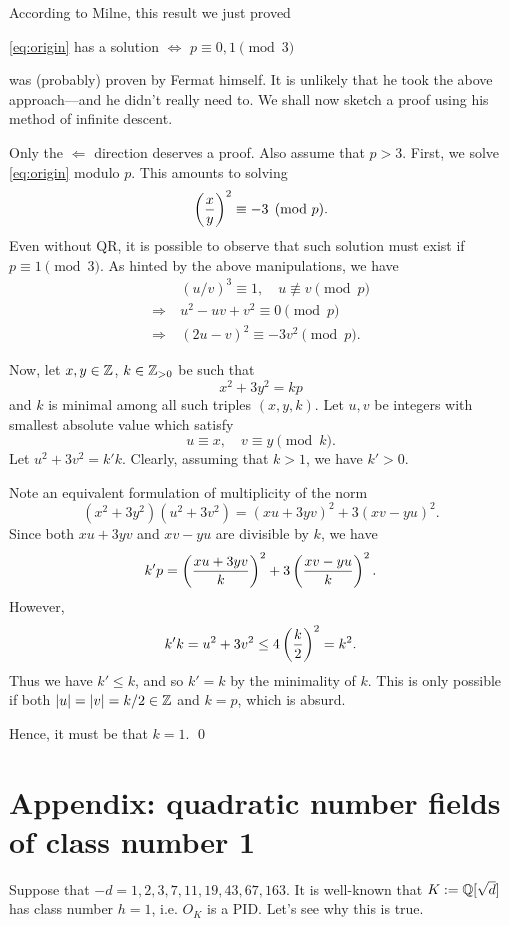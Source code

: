 \documentclass{article}
\begin{document}
According to Milne, this result we just proved
\begin{center}
    \eqref{eq:origin} has a solution $\Longleftrightarrow$ $p\equiv 0,1\pmod{3}$
\end{center}
was (probably) proven by Fermat himself. It is unlikely that he took the above approach---and he didn't really need to. We shall now sketch a proof using his method of infinite descent.

Only the $\Longleftarrow$ direction deserves a proof. Also assume that $p>3$. First, we solve \eqref{eq:origin} modulo $p$. This amounts to solving
\[
    \left(\frac{x}{y}\right)^2 \equiv -3 \pmod{p}.
\]
Even without QR, it is possible to observe that such solution must exist if $p\equiv 1\pmod{3}$. As hinted by the above manipulations, we have
\begin{align*}
    & (u/v)^3 \equiv 1, \quad u\not\equiv v \pmod{p} \\
    \Longrightarrow\ & u^2 - uv + v^2 \equiv 0 \pmod{p} \\
    \Longrightarrow\ & (2u-v)^2 \equiv -3v^2 \pmod{p}.
\end{align*}

Now, let $x,y\in\mathbb{Z}$, $k\in\mathbb{Z}_{>0}$ be such that 
\[
    x^2 + 3y^2 = kp
\]
and $k$ is minimal among all such triples $(x,y,k)$. Let $u,v$ be integers with smallest absolute value which satisfy
\[
    u \equiv x, \quad v \equiv y \pmod{k}.
\]
Let $u^2+3v^2=k'k$. Clearly, assuming that $k>1$, we have $k'>0$.

Note an equivalent formulation of multiplicity of the norm
\[
    (x^2+3y^2)(u^2+3v^2)=(xu+3yv)^2+3(xv-yu)^2.
\]
Since both $xu+3yv$ and $xv-yu$ are divisible by $k$, we have
\[
    k'p = \left(\frac{xu+3yv}{k}\right)^2+3\left(\frac{xv-yu}{k}\right)^2.
\]
However,
\[
    k'k = u^2+3v^2 \leq 4\left(\frac{k}{2}\right)^2 = k^2.
\]
Thus we have $k'\leq k$, and so $k'=k$ by the minimality of $k$. This is only possible if both $\left\vert u\right\vert=\left\vert v\right\vert=k/2\in\mathbb{Z}$ and $k=p$, which is absurd.

Hence, it must be that $k=1$. \qed

\section{Appendix: quadratic number fields of class number 1}\label{sec:appendix}

Suppose that $-d=1, 2, 3, 7, 11, 19, 43, 67, 163$. It is well-known that $K:=\mathbb{Q}[\sqrt{d}]$ has class number $h=1$, i.e. $O_{K}$ is a PID. Let's see why this is true.
\end{document}

